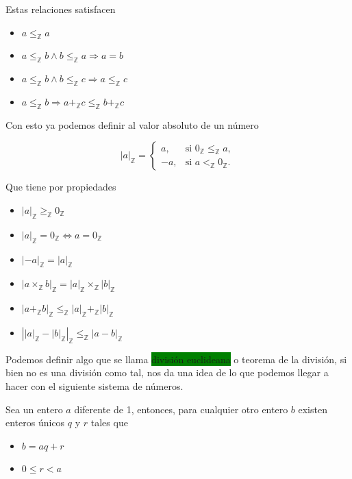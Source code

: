 \documentclass[11pt]{article}
\begin{document}
Estas relaciones satisfacen

\begin{itemize}
    \item $a\leq_{\mathbb Z}a$
    \item $a\leq_{\mathbb Z}b
    \land b\leq_{\mathbb Z}a
    \Longrightarrow a=b$
    \item $a\leq_{\mathbb Z}b
    \land b\leq_{\mathbb Z}c
    \Longrightarrow a\leq_{\mathbb Z}c$
    \item $a\leq_{\mathbb Z}b
    \Longrightarrow
    a+_{\mathbb Z}c\leq_{\mathbb Z}b+_{\mathbb Z}c$
\end{itemize}

Con esto ya podemos definir al valor absoluto de un número

\[
|a|_{\mathbb Z}=
\begin{cases}
a, & \text{si } 0_{\mathbb Z}\leq_{\mathbb Z}a,\\
-a, & \text{si } a<_{\mathbb Z}0_{\mathbb Z}.
\end{cases}
\]

Que tiene por propiedades

\begin{itemize}
    \item $|a|_{\mathbb Z}\geq_{\mathbb Z}0_{\mathbb Z}$
    \item $|a|_{\mathbb Z}=0_{\mathbb Z}
    \iff a=0_{\mathbb Z}$
    \item $|-a|_{\mathbb Z}=|a|_{\mathbb Z}$
    \item $|a\times_{\mathbb Z}b|_{\mathbb Z}
    =|a|_{\mathbb Z}\times_{\mathbb Z}|b|_{\mathbb Z}$
    \item $|a+_{\mathbb Z}b|_{\mathbb Z}
    \leq_{\mathbb Z}
    |a|_{\mathbb Z}+_{\mathbb Z}|b|_{\mathbb Z}$
    \item $\left||a|_{\mathbb Z}-|b|_{\mathbb Z}\right|_{\mathbb Z}
    \leq_{\mathbb Z}|a-b|_{\mathbb Z}$
\end{itemize}

Podemos definir algo que se llama \colorbox{Green}{división euclideana} o teorema de la división, si bien no es una división como tal, nos da una idea de lo que podemos llegar a hacer con el siguiente sistema de números. 

Sea un entero $a$ diferente de 1, entonces, para cualquier otro entero $b$ existen enteros únicos $q$ y $r$ tales que

\begin{itemize}
    \item $b=aq+r$
    \item $0\leq r< a$
\end{itemize}
\end{document}
